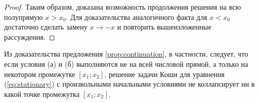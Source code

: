 \begin{proof}
Таким образом, доказана возможность продолжения решения на всю полупрямую $x > x_0$.
Для доказательства аналогичного факта для $x < x_0$ достаточно сделать замену $x \to -x$ и повторить вышеизложенные рассуждения.
\end{proof}

Из доказательства предложения \ref{prop:continuation}, в частности, следует, что если условия (а) и (б) выполняются не на всей числовой прямой, а только на некотором промежутке $[x_1;x_2]$, решение задачи Коши для уравнения (\ref{eq:stationary}) с произвольными начальными условиями не коллапсирует ни в какой точке промежутка $[x_1;x_2]$.
